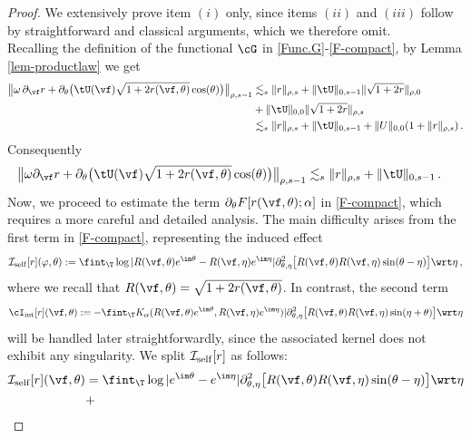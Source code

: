 \documentclass[a4paper,reqno,10pt]{article}
\newcommand{\pa}{\partial}
\begin{document}
\begin{proof}
    We extensively prove item $(i)$ only, since items $(ii)$ and $(iii)$ follow by straightforward and classical arguments, which we therefore omit. \\
    Recalling the definition of the functional $\cG$ in \eqref{Func.G}-\eqref{F-compact}, by Lemma \ref{lem-productlaw} we get
    \begin{align*}
		\big\| \omega \,\pa_{\vf} r + \pa_{\theta} \big( \tU(\vf) \sqrt{1+2 r(\vf,\theta)} \cos(\theta)\big) \big\|_{\rho,s-1} &\lesssim_{s} \| r \|_{\rho,s}+\| \tU \|_{0,s-1} \| \sqrt{1+2 r} \|_{\rho,0}\\
        &+\| \tU \|_{0,0}\| \sqrt{1+2 r} \|_{\rho,s}\\
        &\lesssim_{s} \| r \|_{\rho,s}+\| \tU \|_{0,s-1}+\| U \|_{0,0}(1+\| r \|_{\rho,s}) \,.
    \end{align*}
    Consequently
     \begin{align*}
		\big\| \omega \pa_{\vf} r + \pa_{\theta} \big( \tU(\vf) \sqrt{1+2 r(\vf,\theta)} \cos(\theta)\big) \big\|_{\rho,s-1} &\lesssim_{s} \| r \|_{\rho,s}+\| \tU \|_{0,s-1} \,.
    \end{align*}
    Now, we proceed to estimate the term $\pa_\theta F[r(\vf,\theta);\alpha]$  in \eqref{F-compact}, which requires a more careful and detailed analysis. The main difficulty arises from the first term in \eqref{F-compact}, representing the induced effect
    $$
    \mathcal{I}_{\rm self}[r](\varphi,\theta):= \fint_{\T} \log | R(\vf,\theta) e^{\im\theta} - R(\vf,\eta) e^{\im\eta} | \pa_{\theta,\eta}^2 \big[ R(\vf,\theta) R(\vf,\eta) \sin(\theta-\eta) \big] \wrt \eta\,,
    $$
    where we recall that $R(\vf,\theta)=\sqrt{1+2r(\vf,\theta)}$. In contrast, the second term 
    \begin{equation}\label{I.int}
        \cI_{\rm int}[r] (\vf,\theta) :=  -  \fint_{\T} K_\alpha ( R(\vf,\theta) e^{\im\theta}, R(\vf,\eta) e^{\im\eta} )|\pa_{\theta,\eta}^2 \big[ R(\vf,\theta) R(\vf,\eta) \sin(\eta+\theta) \big] \wrt \eta
    \end{equation}
    will be handled later straightforwardly, since the associated kernel does not exhibit any singularity. We split $\mathcal{I}_{\rm self}[r]$ as follows:
\begin{equation}\label{I.beria}
	    \begin{aligned}
		\mathcal{I}_{\rm self}[r](\vf,\theta)&= \fint_{\T} \log |  e^{\im\theta} -  e^{\im\eta} | \pa_{\theta,\eta}^2 \big[ R(\vf,\theta) R(\vf,\eta) \sin(\theta-\eta) \big] \wrt \eta\\&+

\end{aligned}
\end{equation}
\end{proof}
\end{document}
